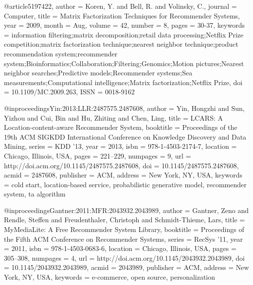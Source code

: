 @article{5197422,
	author = {Koren, Y. and Bell, R. and Volinsky, C.},
	journal = {Computer},
	title = {Matrix Factorization Techniques for Recommender Systems},
	year = {2009},
	month = {Aug},
	volume = {42},
	number = {8},
	pages = {30-37},
	keywords = {information filtering;matrix decomposition;retail data processing;Netflix Prize competition;matrix factorization technique;nearest neighbor technique;product recommendation system;recommender system;Bioinformatics;Collaboration;Filtering;Genomics;Motion pictures;Nearest neighbor searches;Predictive models;Recommender systems;Sea measurements;Computational intelligence;Matrix factorization;Netflix Prize},
	doi = {10.1109/MC.2009.263},
	ISSN = {0018-9162}
}

@inproceedings{Yin:2013:LLR:2487575.2487608,
	author = {Yin, Hongzhi and Sun, Yizhou and Cui, Bin and Hu, Zhiting and Chen, Ling},
	title = {LCARS: A Location-content-aware Recommender System},
	booktitle = {Proceedings of the 19th ACM SIGKDD International Conference on Knowledge Discovery and Data Mining},
	series = {KDD '13},
	year = {2013},
	isbn = {978-1-4503-2174-7},
	location = {Chicago, Illinois, USA},
	pages = {221--229},
	numpages = {9},
	url = {http://doi.acm.org/10.1145/2487575.2487608},
	doi = {10.1145/2487575.2487608},
	acmid = {2487608},
	publisher = {ACM},
	address = {New York, NY, USA},
	keywords = {cold start, location-based service, probabilistic generative model, recommender system, ta algorithm}
}

@inproceedings{Gantner:2011:MFR:2043932.2043989,
	author = {Gantner, Zeno and Rendle, Steffen and Freudenthaler, Christoph and Schmidt-Thieme, Lars},
	title = {MyMediaLite: A Free Recommender System Library},
	booktitle = {Proceedings of the Fifth ACM Conference on Recommender Systems},
	series = {RecSys '11},
	year = {2011},
	isbn = {978-1-4503-0683-6},
	location = {Chicago, Illinois, USA},
	pages = {305--308},
	numpages = {4},
	url = {http://doi.acm.org/10.1145/2043932.2043989},
	doi = {10.1145/2043932.2043989},
	acmid = {2043989},
	publisher = {ACM},
	address = {New York, NY, USA},
	keywords = {e-commerce, open source, personalization}
}

